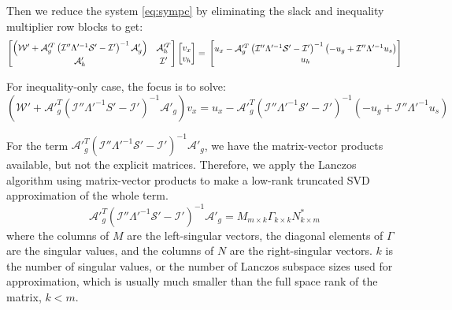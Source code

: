 \documentclass{article}
\theoremstyle{definition}
\begin{document}
Then we reduce the system \eqref{eq:sympc} by eliminating the slack and inequality multiplier row blocks to get: 
\begin{equation}\label{eq:reduce5}
\begin{bmatrix}
\left(\mathcal{W}' + \mathcal{A}'^T_g \left( \mathcal{I}'' \Lambda'^{-1} \mathcal{S}' - \mathcal{I}'\right)^{-1} \mathcal{A}'_g\right) & \mathcal{A}'^T_h \\
\mathcal{A}'_h & \mathcal{I}'
\end{bmatrix}
\begin{bmatrix}
v_x \\ v_h
\end{bmatrix} = \\
\begin{bmatrix}
u_x -  \mathcal{A}'^T_g \left( \mathcal{I}'' \Lambda'^{-1}  \mathcal{S}' - \mathcal{I}' \right)^{-1}  \left(-u_g + \mathcal{I}''\Lambda'^{-1} u_s \right)\\
u_h 
\end{bmatrix}
\end{equation}

For inequality-only case, the focus is to solve:
\begin{equation}\label{eq:pcrd}
\left(\mathcal{W}' + \mathcal{A}'^T_g \left( \mathcal{I}'' \Lambda'^{-1} S' - \mathcal{I}'\right)^{-1} \mathcal{A}'_g \right)v_x = u_x - \mathcal{A}'^T_g \left( \mathcal{I}'' \Lambda'^{-1} \mathcal{S}' - \mathcal{I}'\right)^{-1} \left(-u_g + \mathcal{I}''\Lambda'^{-1} u_s \right)
\end{equation}

For the term  $ \mathcal{A}'^T_g \left( \mathcal{I}'' \Lambda'^{-1} \mathcal{S}' - \mathcal{I}'\right)^{-1} \mathcal{A}'_g$, we have the matrix-vector products available, but not the explicit matrices. Therefore, we apply the Lanczos algorithm using matrix-vector products to make a low-rank truncated SVD approximation of the whole term. 
\begin{equation}\label{eq:lansvd2}
\mathcal{A}'^T_g \left( \mathcal{I}'' \Lambda'^{-1} \mathcal{S}' - \mathcal{I}'\right)^{-1} \mathcal{A}'_g = M_{m\times k}\Gamma_{k\times k} N^{*}_{k\times m}
\end{equation}
where the columns of $M$ are the left-singular vectors, the diagonal elements of $\Gamma$ are the singular values, and the columns of $N$ are the right-singular vectors. $k$ is the number of singular values, or the number of Lanczos subspace sizes used for approximation, which is usually much smaller than the full space rank of the matrix, $k < m$.   
\end{document}
